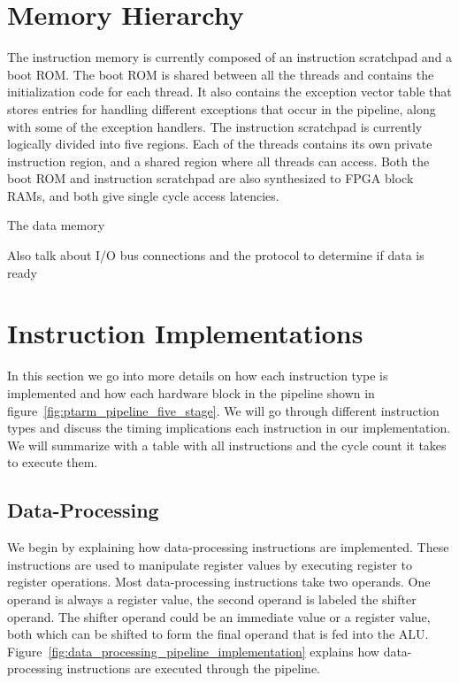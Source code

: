 \section{Memory Hierarchy}
\label{sec:ptarm_memory}


The instruction memory is currently composed of an instruction scratchpad and a boot ROM. 
The boot ROM  is shared between all the threads and contains the initialization code for each thread. 
It also contains the exception vector table that stores entries for handling different exceptions that occur in the pipeline, along with some of the exception handlers. 
The instruction scratchpad  is currently logically divided into five regions. 
Each of the threads contains its own private instruction region, and a shared region where all threads can access.
Both the boot ROM and instruction scratchpad are also synthesized to FPGA block RAMs, and both give single cycle access latencies.

The data memory 

Also talk about I/O bus connections and the protocol to determine if data is ready

\section{Instruction Implementations}
\label{sec:ptarm_instructions}
In this section we go into more details on how each instruction type is implemented and how each hardware block in the pipeline shown in figure~\ref{fig:ptarm_pipeline_five_stage}. 
We will go through different instruction types and discuss the timing implications each instruction in our implementation.
We will summarize with a table with all instructions and the cycle count it takes to execute them.
   
\subsection{Data-Processing}
We begin by explaining how data-processing instructions are implemented.
These instructions are used to manipulate register values by executing register to register operations. 
Most data-processing instructions take two operands.
One operand is always a register value, the second operand is labeled the shifter operand. 
The shifter operand could be an immediate value or a register value, both which can be shifted to form the final operand that is fed into the ALU.
Figure~\ref{fig:data_processing_pipeline_implementation} explains how data-processing instructions are executed through the pipeline.

